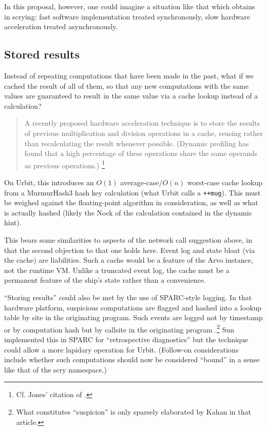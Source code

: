 \documentclass[twoside]{article}
\begin{document}
In this proposal, however, one could imagine a situation like that which obtains in scrying:  fast software implementation treated synchronously, slow hardware acceleration treated asynchronously.

\subsection{Stored results}
\label{stored-results}

Instead of repeating computations that have been made in the past, what if we cached the result of all of them, so that any new computations with the same values are guaranteed to result in the same value via a cache lookup instead of a calculation?

\begin{quote}
A recently proposed hardware acceleration technique is to store the results of previous multiplication and division operations in a cache, reusing rather than recalculating the result whenever possible. (Dynamic profiling has found that a high percentage of these operations share the same operands as previous operations.)  \citep[p.~1148]{Jones2008}\footnote{Cf. Jones' citation of \citeauthor{Citron1998}.}
\end{quote}

On Urbit, this introduces an $O(1)$ average-case/$O(n)$ worst-case cache lookup from a MurmurHash3 hash key calculation (what Urbit calls a \texttt{++mug}).  This must be weighed against the floating-point algorithm in consideration, as well as what is actually hashed (likely the Nock of the calculation contained in the dynamic hint).

This bears some similarities to aspects of the network call suggestion above, in that the second objection to that one holds here.  Event log and state bloat (via the cache) are liabilities.  Such a cache would be a feature of the Arvo instance, not the runtime VM.  Unlike a truncated event log, the cache must be a permanent feature of the ship's state rather than a convenience.

“Storing results” could also be met by the use of SPARC-style logging.  In that hardware platform, suspicious computations are flagged and hashed into a lookup table by site in the originating program.  Such events are logged not by timestamp or by computation hash but by callsite in the originating program \citep[p.~6]{Kahan1997}.\footnote{What constitutes “suspicion” is only sparsely elaborated by Kahan in that article.}  Sun implemented this in SPARC for “retrospective diagnostics” but the technique could allow a more lapidary operation for Urbit.  (Follow-on considerations include whether such computations should now be considered “bound” in a sense like that of the scry namespace.)
\end{document}
